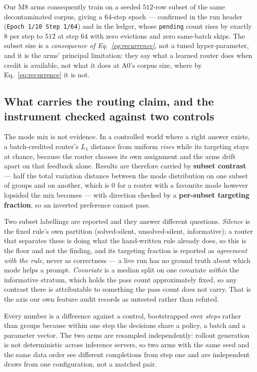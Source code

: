 Our M8 arms consequently train on a seeded $512$-row subset of the same decontaminated corpus,
giving a $64$-step epoch --- confirmed in the run header (\texttt{Epoch 1/10 Step 1/64}) and in
the ledger, whose \texttt{pending} count rises by exactly $8$ per step to $512$ at step $64$ with
zero evictions and zero same-batch skips. The subset size is a \emph{consequence of
Eq.~\ref{eq:recurrence}}, not a tuned hyper-parameter, and it is the arms' principal limitation:
they say what a learned router does when credit is available, not what it does at A0's corpus
size, where by Eq.~\ref{eq:recurrence} it is not.

\subsection{What carries the routing claim, and the instrument checked against two controls}
\label{sec:contrast}

The mode mix is not evidence. In a controlled world where a right answer exists, a
batch-credited router's $L_1$ distance from uniform \emph{rises} while its targeting stays at
chance, because the router chooses its own assignment and the arms drift apart on that feedback
alone. Results are therefore carried by \textbf{subset contrast} --- half the total variation
distance between the mode distribution on one subset of groups and on another, which is $0$ for a
router with a favourite mode however lopsided the mix becomes --- with direction checked by a
\textbf{per-subset targeting fraction}, so an inverted preference cannot pass.

Two subset labellings are reported and they answer different questions. \emph{Silence} is the
fixed rule's own partition (solved-silent, unsolved-silent, informative); a router that separates
these is doing what the hand-written rule already does, so this is the floor and not the finding,
and its targeting fraction is reported as \emph{agreement with the rule}, never as correctness ---
a live run has no ground truth about which mode helps a prompt. \emph{Covariate} is a median split
on one covariate \emph{within} the informative stratum, which holds the pass count approximately
fixed, so any contrast there is attributable to something the pass count does not carry. That is
the axis our own feature audit records as untested rather than refuted.

Every number is a difference against a control, bootstrapped over \emph{steps} rather than groups
because within one step the decisions share a policy, a batch and a parameter vector. The two
arms are resampled independently: rollout generation is not deterministic across inference
servers, so two arms with the same seed and the same data order see different completions from
step one and are independent draws from one configuration, not a matched pair.

